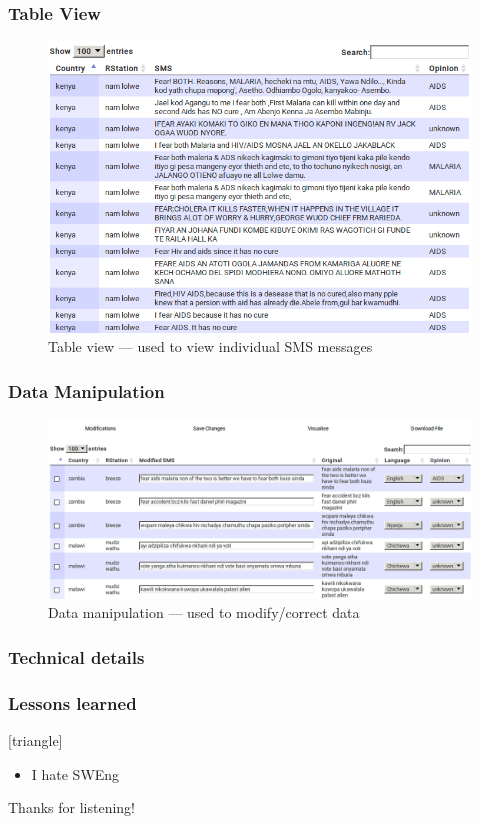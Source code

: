 \documentclass{beamer}
\begin{document}
\begin{frame}
\frametitle{Table View}
  \begin{figure}
    \centering
    \includegraphics[scale=0.3]{./table.png}
    \caption{Table view --- used to view individual SMS messages}
  \end{figure}
\end{frame}

\begin{frame}
\frametitle{Data Manipulation}
  \begin{figure}
    \centering
    \includegraphics[scale=0.3]{./manip.png}
    \caption{Data manipulation --- used to modify/correct data}
  \end{figure}
\end{frame}


\begin{frame}
\frametitle{Technical details}
\end{frame}

\begin{frame}
\frametitle{Lessons learned}
[triangle]
\begin{itemize}[<+->]
\item I hate SWEng
\end{itemize}
\end{frame}

\begin{frame}[c]
\begin{center}
\Huge Thanks for listening!
\end{center}
\end{frame}
\end{document}
